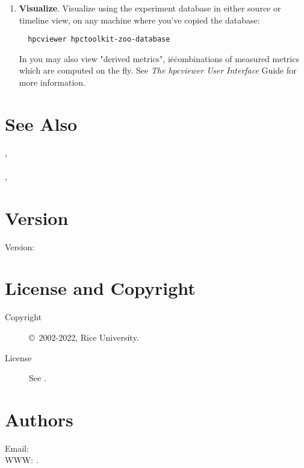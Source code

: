 \documentclass[english]{article}
\begin{document}
\begin{enumerate}
\item \textbf{Visualize}.
Visualize using 
the experiment database in either source or timeline view,
on any machine where you've copied the database:
\begin{verbatim}
  hpcviewer hpctoolkit-zoo-database
\end{verbatim}
In  you may also view "derived metrics",
i\.e\. combinations of measured metrics which are computed on the fly.
See \emph{The hpcviewer User Interface} Guide for more information.

\end{enumerate}



\section{See Also}

,
   \\
 \\
,
   \\

\section{Version}

Version: \Version

\section{License and Copyright}

\begin{description}
\item[Copyright] \copyright\ 2002-2022, Rice University.
\item[License] See .
\end{description}

\section{Authors}

Email:  \\
WWW: .

\LatexManEnd
\end{document}
